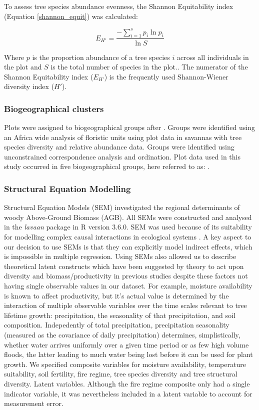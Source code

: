 \documentclass[11pt,a4paper]{article}
\begin{document}
To assess tree species abundance evenness, the Shannon Equitability index \citep{} (Equation \ref{shannon_equit}) was calculated: 

\begin{equation}
	E_{H'} = \frac{-\sum_{i = 1}^{s} p_i \ln{p_i}}{\ln{S}}
	\label{shannon_equit}
\end{equation}

Where $p$ is the proportion abundance of a tree species $i$ across all individuals in the plot and $S$ is the total number of species in the plot.. The numerator of the Shannon Equitability index ($E_{H'}$) is the frequently used Shannon-Wiener diversity index ($H'$).


\subsubsection{Biogeographical clusters}

Plots were assigned to biogeographical groups after \citet{Fayolle2018}. Groups were identified using an Africa wide analysis of floristic units using plot data in savannas with tree species diversity and relative abundance data. Groups were identified using unconstrained correspondence analysis and ordination. Plot data used in this study occurred in five biogeographical groups, here referred to as: .


\subsubsection{Structural Equation Modelling}

Structural Equation Models (SEM) investigated the regional determinants of woody Above-Ground Biomass (AGB). All SEMs were constructed and analysed in the \textit{lavaan} package in R version 3.6.0. SEM was used because of its suitability for modelling complex causal interactions in ecological systems \citep{Lehmann2014_161-166}. A key aspect to our decision to use SEMs is that they can explicitly model indirect effects, which is impossible in multiple regression. Using SEMs also allowed us to describe theoretical latent constructs which have been suggested by theory to act upon diversity and biomass/productivity in previous studies despite these factors not having single observable values in our dataset. For example, moisture availability is known to affect productivity, but it's actual value is determined by the interaction of multiple observable variables over the time scales relevant to tree lifetime growth: precipitation, the seasonality of that precipitation, and soil composition. Indepedently of total precipitation, precipitation seasonality (measured as the covariance of daily precipitation) determines, simplistically, whether water arrives uniformly over a given time period or as few high volume floods, the latter leading to much water being lost before it can be used for plant growth. We specified composite variables for moisture availability, temperature suitability, soil fertility, fire regime, tree species diversity and tree structural diversity. Latent variables. Although the fire regime composite only had a single indicator variable, it was nevertheless included in a latent variable to account for measurement error.
\end{document}
